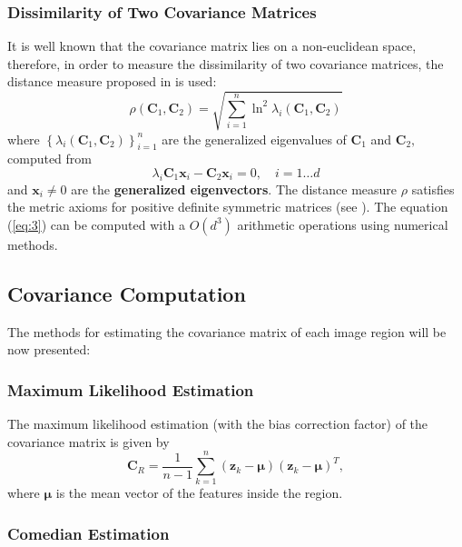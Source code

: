 \documentclass[11pt]{article}
\theoremstyle{definition}
\theoremstyle{remark}
\theoremstyle{remark}
\theoremstyle{remark}
\begin{document}
\subsubsection{Dissimilarity of Two Covariance Matrices} \label{subsub:dis}

It is well known that the covariance matrix lies on a non-euclidean space,
therefore, in order to measure the dissimilarity of two covariance matrices, the
distance measure proposed in \parencite{forstner2003metric} is used:
%
\begin{equation}\label{eq:3}
  \rho\left(\mathbf{C}_{1}, \mathbf{C}_{2}\right)=\sqrt{\sum_{i=1}^{n} \ln ^{2} \lambda_{i}\left(\mathbf{C}_{1}, \mathbf{C}_{2}\right)}
\end{equation}
%
where
$\left\{\lambda_{i}\left(\mathbf{C}_{1}, \mathbf{C}_{2}\right)\right\}_{i=1}^n$
are the generalized eigenvalues of $\mathbf{C}_{1}$ and $\mathbf{C}_{2},$
computed from
%
\[
  \lambda_{i} \mathbf{C}_{1} \mathbf{x}_{i}-\mathbf{C}_{2} \mathbf{x}_{i}=0, \quad i=1 \ldots d
\]
%
and $\mathbf{x}_{i} \neq 0$ are the \textbf{generalized eigenvectors}. The
distance measure $\rho$ satisfies the metric axioms for positive definite
symmetric matrices (see \parencite{tuzel2006}). The equation (\ref{eq:3}) can be
computed with a $O\left(d^{3}\right)$ arithmetic operations using numerical
methods.
\subsection{Covariance Computation}

The methods for estimating the covariance matrix of each image region will be
now presented:

\subsubsection{Maximum Likelihood Estimation}

The maximum likelihood estimation (with the bias correction factor) of the
covariance matrix is given by
%
\begin{equation}
  \mathbf{C}_{R}=\frac{1}{n-1} \sum_{k=1}^{n}\left(\mathbf{z}_{k}-\boldsymbol{\mu}\right)\left(\mathbf{z}_{k}-\boldsymbol{\mu}\right)^{T},
\end{equation}
%
where $\boldsymbol{\mu}$ is the mean vector of the features inside the region.

\subsubsection{Comedian Estimation}
\end{document}

